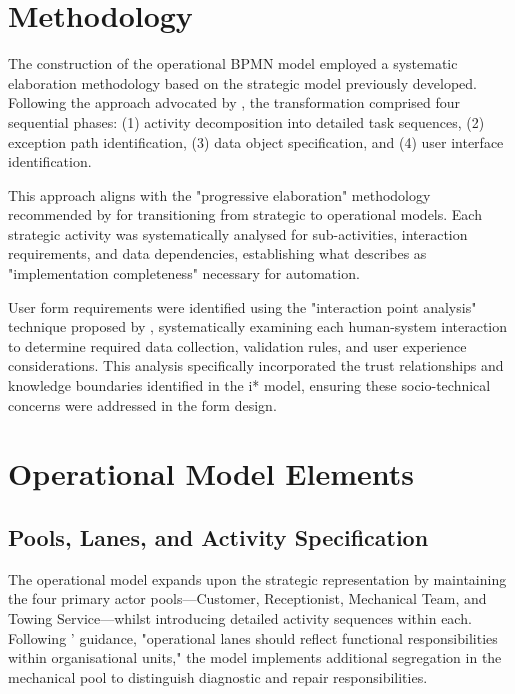 \documentclass[14pt,a4paper]{article}
\begin{document}
\section{Methodology}

The construction of the operational BPMN model employed a systematic elaboration methodology based on the strategic model previously developed. Following the approach advocated by \textit{\parencite[p. 117]{Schönig2018}}, the transformation comprised four sequential phases: (1) activity decomposition into detailed task sequences, (2) exception path identification, (3) data object specification, and (4) user interface identification.

This approach aligns with the "progressive elaboration" methodology recommended by \textit{\parencite[p. 195]{Marin2018}} for transitioning from strategic to operational models. Each strategic activity was systematically analysed for sub-activities, interaction requirements, and data dependencies, establishing what \textit{\parencite[p. 76]{Silver2011}} describes as "implementation completeness" necessary for automation.

User form requirements were identified using the "interaction point analysis" technique proposed by \textit{\parencite[p. 112]{Yousfi2019}}, systematically examining each human-system interaction to determine required data collection, validation rules, and user experience considerations. This analysis specifically incorporated the trust relationships and knowledge boundaries identified in the i* model, ensuring these socio-technical concerns were addressed in the form design.

\section{Operational Model Elements}

\subsection{Pools, Lanes, and Activity Specification}

The operational model expands upon the strategic representation by maintaining the four primary actor pools—Customer, Receptionist, Mechanical Team, and Towing Service—whilst introducing detailed activity sequences within each. Following \textit{\parencite[p. 147]{Kluza2017}}' guidance, "operational lanes should reflect functional responsibilities within organisational units," the model implements additional segregation in the mechanical pool to distinguish diagnostic and repair responsibilities.
\end{document}
